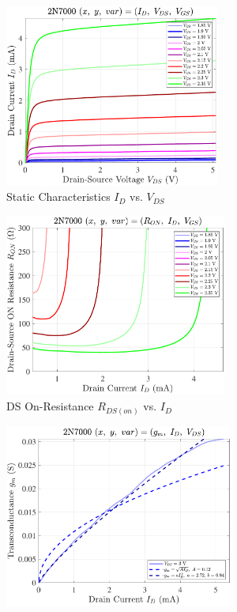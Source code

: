 \documentclass[UTF8]{article}
\begin{document}
\begin{center}
    \noindent\begin{minipage}{0.45\columnwidth}
        \begin{figure}[H]\centering
            \includegraphics[height=170pt]{LCE-04-场效应管/assets/2N7000/2N7000 (NMOS) [onsemi, KH32] current level low (0~5mA)/2025-04-24_00-33-54__stc_Id_Vds_Vgs.pdf}
            \caption{Static Characteristics $I_D$ vs. $V_{DS}$}
        \end{figure}
        \begin{figure}[H]\centering
            \includegraphics[height=170pt]{LCE-04-场效应管/assets/2N7000/2N7000 (NMOS) [onsemi, KH32] current level low (0~5mA)/2025-04-24_00-33-58__stc_Ron_Id_Vgs.pdf}
            \caption{DS On-Resistance $R_{DS(on)}$ vs. $I_D$}
        \end{figure}
        \begin{figure}[H]\centering
            \includegraphics[height=170pt]{LCE-04-场效应管/assets/2N7000/2N7000 (NMOS) [onsemi, KH32] current level low (0~5mA)/2025-04-24_00-34-02__stc_gm_Id_Vds.pdf}

\end{figure}
\end{minipage}
\end{center}
\end{document}
